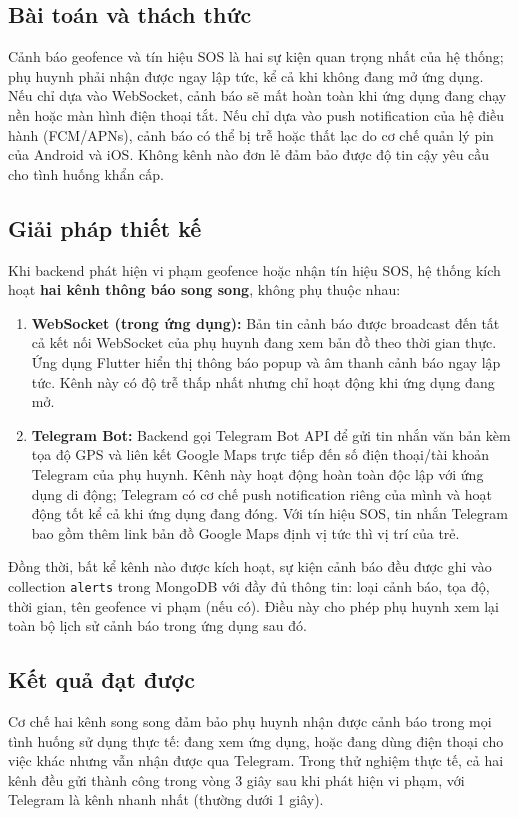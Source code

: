 \documentclass[../DoAn.tex]{subfiles}
\begin{document}
\subsection{Bài toán và thách thức}

Cảnh báo geofence và tín hiệu SOS là hai sự kiện quan trọng nhất của hệ thống; phụ huynh phải nhận được ngay lập tức, kể cả khi không đang mở ứng dụng. Nếu chỉ dựa vào WebSocket, cảnh báo sẽ mất hoàn toàn khi ứng dụng đang chạy nền hoặc màn hình điện thoại tắt. Nếu chỉ dựa vào push notification của hệ điều hành (FCM/APNs), cảnh báo có thể bị trễ hoặc thất lạc do cơ chế quản lý pin của Android và iOS. Không kênh nào đơn lẻ đảm bảo được độ tin cậy yêu cầu cho tình huống khẩn cấp.

\subsection{Giải pháp thiết kế}

Khi backend phát hiện vi phạm geofence hoặc nhận tín hiệu SOS, hệ thống kích hoạt \textbf{hai kênh thông báo song song}, không phụ thuộc nhau:

\begin{enumerate}
    \item \textbf{WebSocket (trong ứng dụng):} Bản tin cảnh báo được broadcast đến tất cả kết nối WebSocket của phụ huynh đang xem bản đồ theo thời gian thực. Ứng dụng Flutter hiển thị thông báo popup và âm thanh cảnh báo ngay lập tức. Kênh này có độ trễ thấp nhất nhưng chỉ hoạt động khi ứng dụng đang mở.

    \item \textbf{Telegram Bot:} Backend gọi Telegram Bot API để gửi tin nhắn văn bản kèm tọa độ GPS và liên kết Google Maps trực tiếp đến số điện thoại/tài khoản Telegram của phụ huynh. Kênh này hoạt động hoàn toàn độc lập với ứng dụng di động; Telegram có cơ chế push notification riêng của mình và hoạt động tốt kể cả khi ứng dụng đang đóng. Với tín hiệu SOS, tin nhắn Telegram bao gồm thêm link bản đồ Google Maps định vị tức thì vị trí của trẻ.
\end{enumerate}

Đồng thời, bất kể kênh nào được kích hoạt, sự kiện cảnh báo đều được ghi vào collection \texttt{alerts} trong MongoDB với đầy đủ thông tin: loại cảnh báo, tọa độ, thời gian, tên geofence vi phạm (nếu có). Điều này cho phép phụ huynh xem lại toàn bộ lịch sử cảnh báo trong ứng dụng sau đó.

\subsection{Kết quả đạt được}

Cơ chế hai kênh song song đảm bảo phụ huynh nhận được cảnh báo trong mọi tình huống sử dụng thực tế: đang xem ứng dụng, hoặc đang dùng điện thoại cho việc khác nhưng vẫn nhận được qua Telegram. Trong thử nghiệm thực tế, cả hai kênh đều gửi thành công trong vòng 3 giây sau khi phát hiện vi phạm, với Telegram là kênh nhanh nhất (thường dưới 1 giây).
\end{document}
